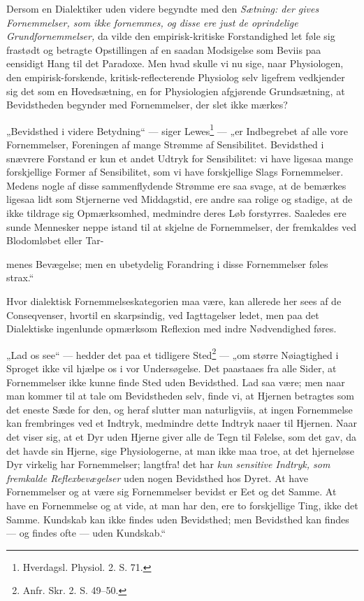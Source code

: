 \documentclass[12pt,a4paper]{book}
\begin{document}
Dersom en Dialektiker uden videre begyndte med den \emph{Sætning: der gives
Fornemmelser, som ikke fornemmes, og disse ere just de oprindelige
Grundfornemmelser,} da vilde den empirisk-kritiske Forstandighed let føle sig
frastødt og betragte Opstillingen af en saadan Modsigelse som Beviis paa
eensidigt Hang til det Paradoxe. Men hvad skulle vi nu sige, naar Physiologen,
den empirisk-forskende, kritisk-reflecterende Physiolog selv ligefrem
vedkjender sig det som en Hovedsætning, en for Physiologien afgjørende
Grundsætning, at Bevidstheden begynder med Fornemmelser, der slet ikke mærkes?

„Bevidsthed i videre Betydning“ --- siger Lewes\footnote{Hverdagsl. Physiol. 2.
S. 71.} --- „er Indbegrebet af alle vore Fornemmelser, Foreningen af mange
Strømme af Sensibilitet. Bevidsthed i snævrere Forstand er kun et andet Udtryk
for Sensibilitet: vi have ligesaa mange forskjellige Former af Sensibilitet,
som vi have forskjellige Slags Fornemmelser. Medens nogle af disse
sammenflydende Strømme ere saa svage, at de bemærkes ligesaa lidt som
Stjernerne ved Middagstid, ere andre saa rolige og stadige, at de ikke tildrage
sig Opmærksomhed, medmindre deres Løb forstyrres. Saaledes ere sunde Mennesker
neppe istand til at skjelne de Fornemmelser, der fremkaldes ved Blodomløbet
eller Tar-

\setcounter{footnote}{0}
menes Bevægelse; men en ubetydelig Forandring i disse Fornemmelser føles
strax.“

Hvor dialektisk Fornemmelseskategorien maa være, kan allerede her sees af de
Conseqvenser, hvortil en skarpsindig, ved Iagttagelser ledet, men paa det
Dialektiske ingenlunde opmærksom Reflexion med indre Nødvendighed føres.

„Lad os see“ --- hedder det paa et tidligere Sted\footnote{Anfr. Skr. 2.
S. 49--50.} --- „om større Nøiagtighed i Sproget ikke vil hjælpe os i vor
Undersøgelse. Det paastaaes fra alle Sider, at Fornemmelser ikke kunne finde
Sted uden Bevidsthed. Lad saa være; men naar man kommer til at tale om
Bevidstheden selv, finde vi, at Hjernen betragtes som det eneste Sæde for den,
og heraf slutter man naturligviis, at ingen Fornemmelse kan frembringes ved et
Indtryk, medmindre dette Indtryk naaer til Hjernen. Naar det viser sig, at et
Dyr uden Hjerne giver alle de Tegn til Følelse, som det gav, da det havde sin
Hjerne, sige Physiologerne, at man ikke maa troe, at det hjerneløse Dyr
virkelig har Fornemmelser; langtfra! det har \emph{kun sensitive Indtryk, som
fremkalde Reflexbevægelser} uden nogen Bevidsthed hos Dyret. At have
Fornemmelser og at være sig Fornemmelser bevidst er Eet og det Samme. At have
en Fornemmelse og at vide, at man har den, ere to forskjellige Ting, ikke det
Samme. Kundskab kan ikke findes uden Bevidsthed; men Bevidsthed kan findes ---
og findes ofte --- uden Kundskab.“
\end{document}
